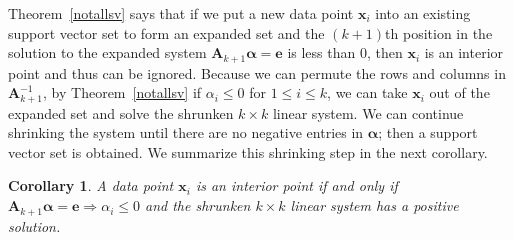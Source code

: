 \documentclass{article}
\newcommand{\thmref}[1]{Theorem~\ref{#1}}
\newtheorem{corollary}[theorem]{Corollary}
\numberwithin{equation}{section}
\begin{document}
\thmref{notallsv} says that if we put a new data point $\mathbf{x}_i$ into an existing support vector set to form an expanded set and the $(k+1)$th position in the solution to the expanded system $\mathbf{A}_{k+1}\boldsymbol{\alpha}=\mathbf{e}$ is less than 0, then $\mathbf{x}_i$ is an interior point and thus can be ignored. Because we can permute the rows and columns in $\mathbf{A}_{k+1}^{-1}$, by \thmref{notallsv} if $\alpha_i\le0$ for $1\le i\le k$, we can take $\mathbf{x}_i$ out of the expanded set and solve the shrunken $k\times k$ linear system. We can continue shrinking the system until there are no negative entries in $\boldsymbol{\alpha}$; then a support vector set is obtained. We summarize this shrinking step in the next corollary.
\begin{corollary}\label{notallsvcor}
A data point $\mathbf{x}_{i}$ is an interior point if and only if $\mathbf{A}_{k+1}\boldsymbol{\alpha}=\mathbf{e}\Rightarrow\alpha_{i}\le0$ and the shrunken $k\times k$ linear system has a positive solution.
\end{corollary}
\end{document}
